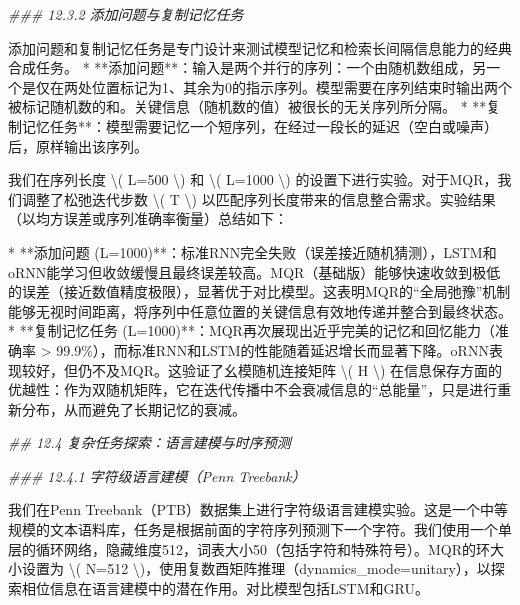 \documentclass[
  12pt,
]{article}
\newenvironment{Shaded}{}{}
\newcommand{\CommentTok}[1]{\textcolor[rgb]{0.38,0.63,0.69}{\textit{#1}}}
\newcommand{\DecValTok}[1]{\textcolor[rgb]{0.25,0.63,0.44}{#1}}
\newcommand{\FloatTok}[1]{\textcolor[rgb]{0.25,0.63,0.44}{#1}}
\newcommand{\NormalTok}[1]{#1}
\newcommand{\OperatorTok}[1]{\textcolor[rgb]{0.40,0.40,0.40}{#1}}
\begin{document}
\begin{Shaded}
\begin{Highlighting}[]
\CommentTok{\#\#\# 12.3.2 添加问题与复制记忆任务}

\NormalTok{添加问题和复制记忆任务是专门设计来测试模型记忆和检索长间隔信息能力的经典合成任务。}
\OperatorTok{*}   \OperatorTok{**}\NormalTok{添加问题}\OperatorTok{**}\NormalTok{：输入是两个并行的序列：一个由随机数组成，另一个是仅在两处位置标记为}\DecValTok{1}\NormalTok{、其余为}\DecValTok{0}\NormalTok{的指示序列。模型需要在序列结束时输出两个被标记随机数的和。关键信息（随机数的值）被很长的无关序列所分隔。}
\OperatorTok{*}   \OperatorTok{**}\NormalTok{复制记忆任务}\OperatorTok{**}\NormalTok{：模型需要记忆一个短序列，在经过一段长的延迟（空白或噪声）后，原样输出该序列。}

\NormalTok{我们在序列长度 }\OperatorTok{\textbackslash{}}\NormalTok{( L}\OperatorTok{=}\DecValTok{500} \OperatorTok{\textbackslash{}}\NormalTok{) 和 }\OperatorTok{\textbackslash{}}\NormalTok{( L}\OperatorTok{=}\DecValTok{1000} \OperatorTok{\textbackslash{}}\NormalTok{) 的设置下进行实验。对于MQR，我们调整了松弛迭代步数 }\OperatorTok{\textbackslash{}}\NormalTok{( T }\OperatorTok{\textbackslash{}}\NormalTok{) 以匹配序列长度带来的信息整合需求。实验结果（以均方误差或序列准确率衡量）总结如下：}

\OperatorTok{*}   \OperatorTok{**}\NormalTok{添加问题 (L}\OperatorTok{=}\DecValTok{1000}\NormalTok{)}\OperatorTok{**}\NormalTok{：标准RNN完全失败（误差接近随机猜测），LSTM和oRNN能学习但收敛缓慢且最终误差较高。MQR（基础版）能够快速收敛到极低的误差（接近数值精度极限），显著优于对比模型。这表明MQR的“全局弛豫”机制能够无视时间距离，将序列中任意位置的关键信息有效地传递并整合到最终状态。}
\OperatorTok{*}   \OperatorTok{**}\NormalTok{复制记忆任务 (L}\OperatorTok{=}\DecValTok{1000}\NormalTok{)}\OperatorTok{**}\NormalTok{：MQR再次展现出近乎完美的记忆和回忆能力（准确率 }\OperatorTok{\textgreater{}} \FloatTok{99.9}\OperatorTok{\%}\NormalTok{），而标准RNN和LSTM的性能随着延迟增长而显著下降。oRNN表现较好，但仍不及MQR。这验证了幺模随机连接矩阵 }\OperatorTok{\textbackslash{}}\NormalTok{( H }\OperatorTok{\textbackslash{}}\NormalTok{) 在信息保存方面的优越性：作为双随机矩阵，它在迭代传播中不会衰减信息的“总能量”，只是进行重新分布，从而避免了长期记忆的衰减。}

\CommentTok{\#\# 12.4 复杂任务探索：语言建模与时序预测}

\CommentTok{\#\#\# 12.4.1 字符级语言建模（Penn Treebank）}

\NormalTok{我们在Penn Treebank（PTB）数据集上进行字符级语言建模实验。这是一个中等规模的文本语料库，任务是根据前面的字符序列预测下一个字符。我们使用一个单层的循环网络，隐藏维度}\DecValTok{512}\NormalTok{，词表大小}\DecValTok{50}\NormalTok{（包括字符和特殊符号）。MQR的环大小设置为 }\OperatorTok{\textbackslash{}}\NormalTok{( N}\OperatorTok{=}\DecValTok{512} \OperatorTok{\textbackslash{}}\NormalTok{)，使用复数酉矩阵推理（\textasciigrave{}dynamics\_mode}\OperatorTok{=}\NormalTok{unitary\textasciigrave{}），以探索相位信息在语言建模中的潜在作用。对比模型包括LSTM和GRU。}


\end{Highlighting}
\end{Shaded}
\end{document}

